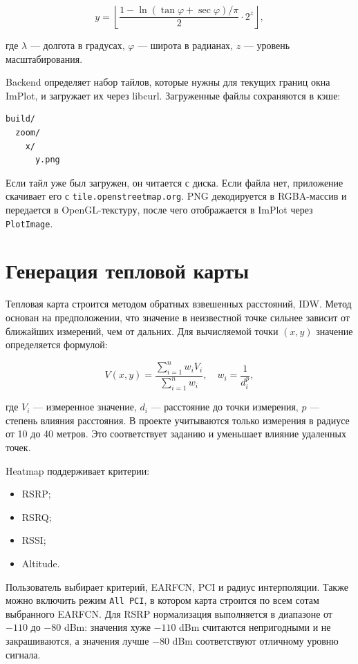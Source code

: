 \documentclass[14pt,a4paper]{extarticle}
\begin{document}
\[
y = \left\lfloor \frac{1 - \ln(\tan \varphi + \sec \varphi)/\pi}{2} \cdot 2^z \right\rfloor,
\]

где $\lambda$ --- долгота в градусах, $\varphi$ --- широта в радианах, $z$ --- уровень масштабирования.

Backend определяет набор тайлов, которые нужны для текущих границ окна ImPlot, и загружает их через libcurl. Загруженные файлы сохраняются в кэше:

\begin{lstlisting}[caption={Структура кэша OSM-тайлов}]
build/
  zoom/
    x/
      y.png
\end{lstlisting}

Если тайл уже был загружен, он читается с диска. Если файла нет, приложение скачивает его с \texttt{tile.openstreetmap.org}. PNG декодируется в RGBA-массив и передается в OpenGL-текстуру, после чего отображается в ImPlot через \texttt{PlotImage}.

\section{Генерация тепловой карты}

Тепловая карта строится методом обратных взвешенных расстояний, IDW. Метод основан на предположении, что значение в неизвестной точке сильнее зависит от ближайших измерений, чем от дальних. Для вычисляемой точки $(x,y)$ значение определяется формулой:

\[
V(x,y) = \frac{\sum\limits_{i=1}^{n} w_i V_i}{\sum\limits_{i=1}^{n} w_i},
\quad
w_i = \frac{1}{d_i^p},
\]

где $V_i$ --- измеренное значение, $d_i$ --- расстояние до точки измерения, $p$ --- степень влияния расстояния. В проекте учитываются только измерения в радиусе от 10 до 40 метров. Это соответствует заданию и уменьшает влияние удаленных точек.

Heatmap поддерживает критерии:
\begin{itemize}
    \item RSRP;
    \item RSRQ;
    \item RSSI;
    \item Altitude.
\end{itemize}

Пользователь выбирает критерий, EARFCN, PCI и радиус интерполяции. Также можно включить режим \texttt{All PCI}, в котором карта строится по всем сотам выбранного EARFCN. Для RSRP нормализация выполняется в диапазоне от $-110$ до $-80$ dBm: значения хуже $-110$ dBm считаются непригодными и не закрашиваются, а значения лучше $-80$ dBm соответствуют отличному уровню сигнала.
\end{document}
